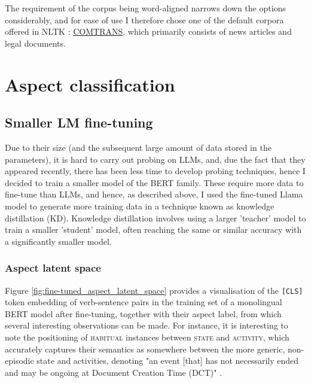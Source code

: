 The requirement of the corpus being word-aligned narrows down the options considerably, and for ease of use I therefore chose one of the default corpora offered in NLTK \citep{bird2009natural}: \hyperlink{https://cordis.europa.eu/project/id/23845/reporting}{COMTRANS}, which primarily consists of news articles and legal documents. 

\section{Aspect classification}

\subsection{Smaller LM fine-tuning}
Due to their size (and the subsequent large amount of data stored in the parameters), it is hard to carry out probing on LLMs, and, due the fact that they appeared recently, there has been less time to develop probing techniques, hence I decided to train a smaller model of the BERT \citep{devlin2019bert} family. These require more data to fine-tune than LLMs, and hence, as described above, I used the fine-tuned Llama model to generate more training data in a technique known as knowledge distillation (KD). Knowledge distillation involves using a larger 'teacher' model to train a smaller 'student' model, often reaching the same or similar accuracy with a significantly smaller model. 

\subsubsection{Aspect latent space}
Figure \ref{fig:fine-tuned_aspect_latent_space} provides a visualisation of the \texttt{[CLS]} token embedding of verb-sentence pairs in the training set of a monolingual BERT model after fine-tuning, together with their aspect label, from which several interesting observations can be made. For instance, it is interesting to note the positioning of \textsc{habitual} instances between \textsc{state} and \textsc{activity}, which accurately captures their semantics as somewhere between the more generic, non-episodic state and activities, denoting "an event [that] has not necessarily ended and may be ongoing at Document Creation Time (DCT)" \citep{umr}.

